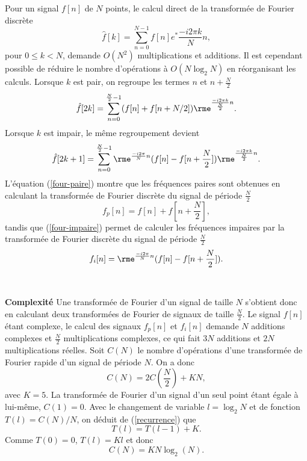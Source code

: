 Pour un signal $f[n]$ de $N$ points, le calcul direct
de la transform\'ee de Fourier discr\`ete
\begin{equation}
{\hat f[k]}  = \sum_{n=0} ^{N-1} f[n] e^*{ \frac {-i2 \pi k} N n  } ,
\end{equation}
pour $0 \leq k < N$,
demande $O(N^2)$ multiplications et additions.
Il est cependant possible de
r\'eduire le nombre d'op\'erations \`a $O(N \log_2 N)$
en r\'eorganisant les calculs.
Lorsque $k$ est pair, on regroupe les termes
$n$ et $n+\frac N 2$
\begin{equation}
\label{four-paire}
{\hat f [2k]}  = \sum_{n=0} ^{{\frac N 2}-1} (f[n]+f[n+ N/ 2 ])
\rme^{ \frac {-i2 \pi k} {{\frac N 2}}n} .
\end{equation}
Lorsque $k$ est impair, le m\^eme regroupement devient
\begin{equation}
\label{four-impaire}
{\hat f [2k+1]}  =
\sum_{n=0} ^{{\frac N 2}-1} \rme^{ \frac {-i2 \pi} N n}
(f[n]-f[n+{\frac N 2}])
\rme^{ \frac {-i2 \pi k} {{\frac N 2}} n} .
\end{equation}
L'\'equation (\ref{four-paire})
montre que les fr\'equences paires sont obtenues
en calculant la transform\'ee de Fourier discr\`ete du signal
de p\'eriode ${\frac N 2}$
\[
f_p [n] = f[n] + f[n+{\frac N 2}],
\]
tandis que (\ref{four-impaire})
permet de calculer les fr\'equences impaires par la
transform\'ee de Fourier discr\`ete du signal de p\'eriode ${\frac N 2}$
\[
f_i [n] = \rme^{ \frac {-i2 \pi} N n}  (f[n] - f[n+{\frac N 2}] ).
\]
\\
\\
{\bf Complexit\'e}
Une transform\'ee de Fourier d'un signal de taille $N$ s'obtient
donc en calculant deux transform\'ees de Fourier de signaux de
taille ${\frac N 2}$.
Le signal $f[n]$ \'etant complexe, le calcul
des signaux $f_p [n]$ et $f_i[n]$
demande
$N$ additions complexes et ${\frac N 2}$ multiplications complexes,
ce qui fait $3N$ additions et $2N$ multiplications r\'eelles.
Soit $C(N)$ le nombre d'op\'erations d'une transform\'ee de Fourier
rapide d'un signal de p\'eriode $N$. On a donc
\begin{equation}
\label{recurrence}
C(N) = 2 C({\frac N 2}) + K N ,
\end{equation}
avec $K = 5$.
La transform\'ee de Fourier d'un signal d'un seul point \'etant
\'egale \`a lui-m\^eme, $C(1) = 0$.
Avec le changement de variable $l = \log_2 N$ et de fonction
$T(l) = C(N)/N$, on d\'eduit de (\ref{recurrence}) que
\[
T(l) = T(l-1) + K .
\]
Comme $T(0) = 0$, $T(l) = Kl$ et donc
\[
C(N) = K N \log_2 (N) .
\]

